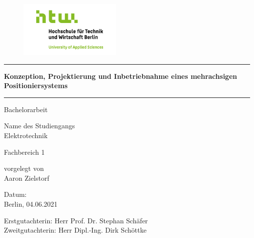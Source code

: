 \documentclass[12pt, a4paper, twoside]{article} %
\begin{document}
\begin{titlepage}

	\vspace*{-2.0cm}

	\begin{figure}[h]\centering
		\includegraphics[width=5cm]{Images/HTW_Logo.png}
	\end{figure}

	\begin{center}
	\vspace*{-1.59cm}

	\par\noindent\rule{\textwidth}{0.4pt}
	\huge
	\textcolor{htw}{\textbf{Konzeption, Projektierung und Inbetriebnahme eines mehrachsigen Positioniersystems}}
	\par\noindent\rule{\textwidth}{0.4pt}
	\vspace*{2.0cm}
	\Large
	Bachelorarbeit
	
	\normalsize
	Name des Studiengangs\\
	\vspace*{0.4cm}
	\Large
	Elektrotechnik
	
	\vspace*{0.6cm}
	\Large
	\textcolor{htw}{Fachbereich 1}
	
	\vspace*{0.6cm}
	\normalsize
	vorgelegt von\\
	\vspace*{0.4cm}
	\Large
	Aaron Zielstorf
	
	\vspace*{3.0cm}
	\small
	Datum:\\
	\normalsize
	Berlin, 04.06.2021
	
	\vspace*{1.6cm}
	\normalsize
	Erstgutachter\textunderscore in: Herr Prof. Dr. Stephan Schäfer\\
	Zweitgutachter\textunderscore in: Herr Dipl.-Ing. Dirk Schöttke
	
	\end{center}
\end{titlepage}


\pagestyle{empty}
\setcounter{tocdepth}{3} %
\tableofcontents
\clearpage
\end{document}
